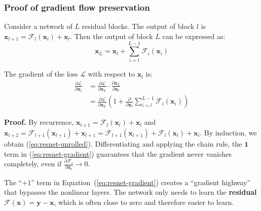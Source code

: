 \subsubsection{Proof of gradient flow preservation}

\begin{theorem}
\label{thm:resnet-gradient}
Consider a network of $L$ residual blocks. The output of block $l$ is
$\mathbf{x}_{l+1} = \mathcal{F}_l(\mathbf{x}_l) + \mathbf{x}_l$. Then
the output of block $L$ can be expressed as:
\begin{equation}
\mathbf{x}_L = \mathbf{x}_l + \sum_{i=l}^{L-1} \mathcal{F}_i(\mathbf{x}_i)
\label{eq:resnet-unrolled}
\end{equation}

The gradient of the loss $\mathcal{L}$ with respect to $\mathbf{x}_l$ is:
\begin{align}
\frac{\partial \mathcal{L}}{\partial \mathbf{x}_l}
&= \frac{\partial \mathcal{L}}{\partial \mathbf{x}_L}
   \cdot \frac{\partial \mathbf{x}_L}{\partial \mathbf{x}_l} \nonumber \\
&= \frac{\partial \mathcal{L}}{\partial \mathbf{x}_L}
   \left(1 + \frac{\partial}{\partial \mathbf{x}_l}
   \sum_{i=l}^{L-1} \mathcal{F}_i(\mathbf{x}_i)\right)
\label{eq:resnet-gradient}
\end{align}

\textbf{Proof.}
By recurrence, $\mathbf{x}_{l+1} = \mathcal{F}_l(\mathbf{x}_l) + \mathbf{x}_l$
and $\mathbf{x}_{l+2} = \mathcal{F}_{l+1}(\mathbf{x}_{l+1}) + \mathbf{x}_{l+1}
= \mathcal{F}_{l+1}(\mathbf{x}_{l+1}) + \mathcal{F}_l(\mathbf{x}_l) + \mathbf{x}_l$.
By induction, we obtain (\ref{eq:resnet-unrolled}). Differentiating and
applying the chain rule, the $\mathbf{1}$ term in
(\ref{eq:resnet-gradient}) guarantees that the gradient never vanishes
completely, even if $\frac{\partial \mathcal{F}_i}{\partial \mathbf{x}_l}
\to 0$.
\end{theorem}

\begin{intuition}[title=\textbf{Why ResNet works}]
The ``$+1$'' term in Equation~(\ref{eq:resnet-gradient}) creates a
``gradient highway'' that bypasses the nonlinear layers. The network
only needs to learn the \textbf{residual}
$\mathcal{F}(\mathbf{x}) = \mathbf{y} - \mathbf{x}$, which is often close
to zero and therefore easier to learn.
\end{intuition}

